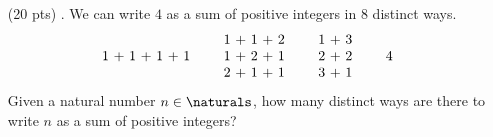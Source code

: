\begin{enumerate}
  \item[(20 pts) \quad 4.]
    We can write $4$ as a sum of positive integers in 8 distinct ways.
    \begin{equation*}
      \begin{tabular}{cccccccc}
                      &\quad& 1 + 1 + 2 &\quad& 1 + 3           \\
        1 + 1 + 1 + 1 &\quad& 1 + 2 + 1 &\quad& 2 + 2 &\quad& 4 \\
                      &\quad& 2 + 1 + 1 &\quad& 3 + 1           \\
      \end{tabular}
    \end{equation*}
    Given a natural number $n \in \naturals$, how many distinct ways are there to write $n$ as a sum of positive integers?


\end{enumerate}
